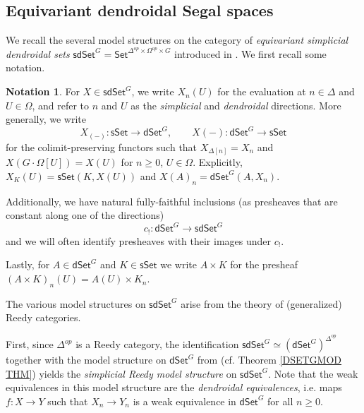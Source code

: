 \documentclass[a4paper,10pt
,draft
]{article}%
\numberwithin{equation}{section}
\numberwithin{figure}{section}
\theoremstyle{definition} %
\newtheorem{notation}[equation]{Notation}%
\newcommand{\longto}{\longrightarrow}%
\newcommand{\Set}{\ensuremath{\mathsf{Set}}}
\newcommand{\sSet}{\ensuremath{\mathsf{sSet}}}%
\newcommand{\dSet}{\mathsf{dSet}}
\newcommand{\1}{\ensuremath{\mathbbm 1}}%
\begin{document}
\subsection{Equivariant dendroidal Segal spaces}
\label{JT_SEC}


We recall the several model structures on the category of
\textit{equivariant simplicial dendroidal sets}
$\mathsf{sdSet}^G = \Set^{\Delta^{op} \times \Omega^{op} \times G}$
introduced in \cite{BP_edss}.
We first recall some notation.



\begin{notation}
      For $X \in \mathsf{sdSet}^G$, we write $X_n(U)$ for the evaluation at $n \in \Delta$ and $U \in \Omega$,
      and refer to $n$ and $U$ as the \textit{simplicial} and \textit{dendroidal} directions.
      More generally, we write
      \begin{equation}
            \label{SDSET_EQ}
            X_{(-)} \colon \sSet \to \dSet^G,
            \qquad
            X(-) \colon \dSet^G \to \sSet
      \end{equation}
      for the colimit-preserving functors
      such that $X_{\Delta[n]} = X_n$ and 
      $X\left(G \cdot\Omega[U]\right) = X(U)$ for $n \geq 0$, $U \in \Omega$.
      Explicitly, $X_K(U) = \sSet(K, X(U))$ and $X(A)_n = \dSet^G(A, X_n)$.
      
	Additionally, we have natural fully-faithful inclusions
	(as presheaves that are constant along one of the directions)
\[
	c_{!} \colon \dSet^G \longto \mathsf{sdSet}^G
\]
	and we will often identify presheaves with their images under $c_!$.

	Lastly, for $A \in \dSet^G$ and $K \in \sSet$ we write $A \times K$ for the presheaf $(A \times K)_n(U) = A(U) \times K_n$.
\end{notation}


The various model structures on $\mathsf{sdSet}^G$ arise
from the theory of (generalized) Reedy categories.


First, since $\Delta^{op}$ is a Reedy category,
the identification
$\mathsf{sdSet}^G \simeq 
\left(\mathsf{dSet}^G\right)^{\Delta^{op}}$
together with the model structure on 
$\mathsf{dSet}^G$ from \cite{Per18}
(cf. Theorem \ref{DSETGMOD THM})
yields the 
\textit{simplicial Reedy model structure} on $\mathsf{sdSet}^G$.
Note that the weak equivalences in this model structure
are the \textit{dendroidal equivalences},
i.e. maps
$f \colon X \to Y$
such that $X_n \to Y_n$ is a weak equivalence in $\dSet^G$ for all $n \geq 0$.
\end{document}
